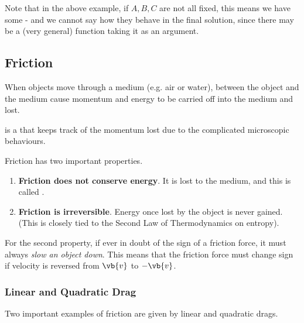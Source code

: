 Note that in the above example, if \(A, B, C\) are not all fixed, this means we have some  - and we cannot say how they behave in the final solution, since there may be a (very general) function taking it as an argument.

\subsection{Friction}

When objects move through a medium (e.g. air or water),  between the object and the medium cause momentum and energy to be carried off into the medium and lost.

\begin{definition}[Friction]
    \label{def:friction}%
     is a  that keeps track of the momentum lost due to the complicated microscopic behaviours.
\end{definition}

Friction has two important properties.

\begin{enumerate}
    \item \textbf{Friction does not conserve energy}. It is lost to the medium, and this is called .
    \item \textbf{Friction is irreversible}. Energy once lost by the object is never gained. (This is closely tied to the Second Law of Thermodynamics on entropy).
\end{enumerate}

For the second property, if ever in doubt of the sign of a friction force, it must always \emph{slow an object down}. This means that the friction force must change sign if velocity is reversed from \(\vb{v}\) to \(- \vb{v}\).

\subsubsection{Linear and Quadratic Drag}

Two important examples of friction are given by linear and quadratic drags.

